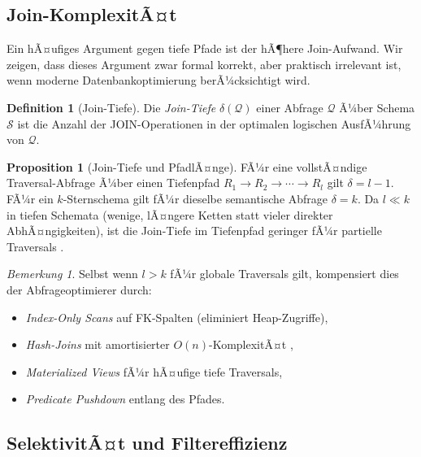 ﻿\documentclass[12pt,a4paper]{article}
\theoremstyle{definition}
\newtheorem{definition}{Definition}[section]
\newtheorem{proposition}[theorem]{Proposition}
\theoremstyle{remark}
\newtheorem{remark}{Bemerkung}[section]
\begin{document}
\subsection{Join-KomplexitÃ¤t}

Ein hÃ¤ufiges Argument gegen tiefe Pfade ist der hÃ¶here Join-Aufwand.
Wir zeigen, dass dieses Argument zwar formal korrekt, aber praktisch
irrelevant ist, wenn moderne Datenbankoptimierung berÃ¼cksichtigt wird.

\begin{definition}[Join-Tiefe]
Die \emph{Join-Tiefe} $\delta(\mathcal{Q})$ einer Abfrage $\mathcal{Q}$ Ã¼ber
Schema $\mathcal{S}$ ist die Anzahl der JOIN-Operationen in der optimalen
logischen AusfÃ¼hrung von $\mathcal{Q}$.
\end{definition}

\begin{proposition}[Join-Tiefe und PfadlÃ¤nge]
\label{prop:jointiefe}
FÃ¼r eine vollstÃ¤ndige Traversal-Abfrage Ã¼ber einen Tiefenpfad
$R_1 \to R_2 \to \cdots \to R_l$ gilt $\delta = l - 1$.
FÃ¼r ein $k$-Sternschema gilt fÃ¼r dieselbe semantische Abfrage $\delta = k$.
Da $l \ll k$ in tiefen Schemata (wenige, lÃ¤ngere Ketten statt vieler
direkter AbhÃ¤ngigkeiten), ist die Join-Tiefe im Tiefenpfad geringer
fÃ¼r partielle Traversals \cite{Ramakrishnan2003}.
\end{proposition}

\begin{remark}
Selbst wenn $l > k$ fÃ¼r globale Traversals gilt, kompensiert dies der
Abfrageoptimierer durch:
\begin{itemize}
  \item \emph{Index-Only Scans} auf FK-Spalten (eliminiert Heap-Zugriffe),
  \item \emph{Hash-Joins} mit amortisierter $O(n)$-KomplexitÃ¤t \cite{Graefe1993},
  \item \emph{Materialized Views} fÃ¼r hÃ¤ufige tiefe Traversals,
  \item \emph{Predicate Pushdown} entlang des Pfades.
\end{itemize}
\end{remark}

\subsection{SelektivitÃ¤t und Filtereffizienz}
\end{document}
